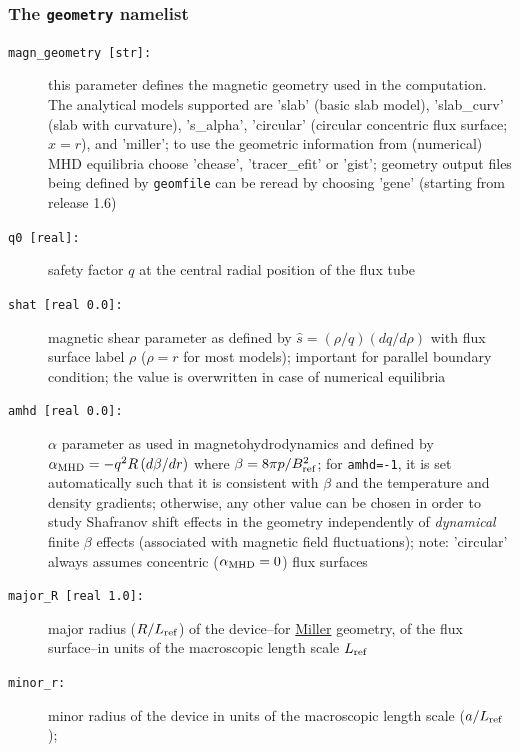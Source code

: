 \documentclass[12pt]{article}
\begin{document}
\subsubsection{The \texttt{geometry} namelist}
\hypertarget{geometry_nml}{}
\begin{description}
\item[\hypertarget{magn_geometry}{\tt magn\_geometry [str]:}] this parameter defines the magnetic geometry used in the computation. 
  The analytical models supported are 'slab' (basic slab model), 'slab\_curv' (slab with curvature), 
  's\_alpha', 'circular' (circular concentric flux surface; $x = r$), and 'miller'; 
  to use the geometric information from 
  (numerical) MHD equilibria choose 'chease', 'tracer\_efit' or 'gist';
  \gene geometry output files being defined by \texttt{geomfile} can be reread 
  by choosing 'gene' (starting from release 1.6)
%
%
\item[{\parbox[t]{0.9\linewidth}{additional parameters for analytical equilibrium models\\
 's\_alpha', 'circular', and 'miller':}}]
\item[\hypertarget{q0}{\texttt{q0 [real]:}}] safety factor $q$ at the central radial position of the flux tube
\item[\texttt{shat [real 0.0]:}] magnetic shear parameter as defined by $\hat s=(\rho/q)(dq/d\rho)$ with flux surface label $\rho$ 
 ($\rho = r$ for most models); important for parallel boundary condition; the value is overwritten in case of numerical equilibria
\item[\texttt{amhd [real 0.0]:}] $\alpha$ parameter as used in magnetohydrodynamics and defined by
  $\alpha_{\rm MHD}=-q^2R\,(d\beta/dr)$ where $\beta=8\pi p/B_{\rm ref}^2$; for \texttt{amhd=-1}, it is set automatically
  such that it is consistent with $\beta$ and the temperature and density gradients; otherwise, any
  other value can be chosen in order to study Shafranov shift effects in the geometry independently of
  {\em dynamical} finite $\beta$ effects (associated with magnetic field fluctuations); note: 'circular' always assumes 
  concentric ($\alpha_{\rm MHD} = 0$) flux surfaces
\item[\texttt{major\_R [real 1.0]:}] major radius ($R/L_{\rm ref}$) of the device--for \hyperlink{desc:miller}{Miller} geometry, 
of the flux surface--in units of the macroscopic length scale $L_{\rm ref}$
\item[\hypertarget{minor_r}{\texttt{minor\_r:}}] minor radius of the device in units of the macroscopic length scale ($a/L_{\rm ref}$); 

\end{description}
\end{document}
